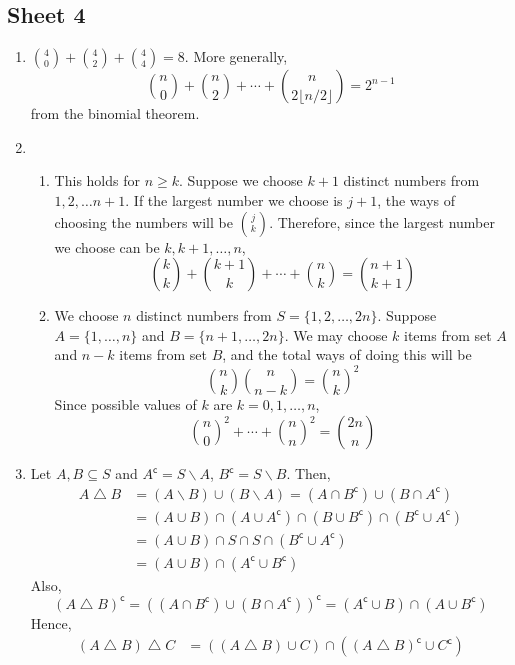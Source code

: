 \documentclass[10pt, a4paper, twoside]{report}
\begin{document}
\subsection{Sheet 4}
\begin{enumerate}[{1.}]
    \item \(\binom 40+\binom 42+\binom 44=8\). More generally, 
    \[\binom n0+\binom n2+\cdots +\binom n{2\lfloor n/2\rfloor}=2^{n-1}\]
    from the binomial theorem.
    \item \begin{enumerate}[{(i)}]
        \item This holds for \(n\geq k\). Suppose we choose \(k+1\) distinct numbers from \({1,2,\ldots n+1}\). If the largest number we choose is \(j+1\), the ways of choosing the numbers will be \(\binom jk\). Therefore, since the largest number we choose can be \(k,k+1,\ldots,n\),
        \[\binom kk+\binom{k+1}k+\cdots+\binom nk=\binom{n+1}{k+1}\]
        \item We choose \(n\) distinct numbers from \(S=\{1,2,\ldots,2n\}\). Suppose \(A=\{1,\ldots,n\}\) and \(B=\{n+1,\ldots,2n\}\). We may choose \(k\) items from set \(A\) and \(n-k\) items from set \(B\), and the total ways of doing this will be 
        \[\binom nk\binom n{n-k}={\binom nk}^2\]
        Since possible values of \(k\) are \(k=0,1,\ldots,n\),
        \[{\binom n0}^2+\cdots+{\binom nn}^2=\binom{2n}n\]
    \end{enumerate}
    \item Let \(A,B\subseteq S\) and \(A^\mathsf{c}=S\backslash A\), \(B^\mathsf{c}=S\backslash B\). Then,
    \begin{align*}
        A\bigtriangleup B&=(A\backslash B)\cup(B\backslash A)=(A\cap B^\mathsf{c})\cup(B\cap A^\mathsf{c}) \\
        &=(A\cup B)\cap (A\cup A^\mathsf{c})\cap (B\cup B^\mathsf{c})\cap (B^\mathsf{c}\cup A^\mathsf{c}) \\
        &=(A\cup B)\cap S\cap S\cap (B^\mathsf{c}\cup A^\mathsf{c}) \\
        &=(A\cup B)\cap(A^\mathsf{c}\cup B^\mathsf{c})
    \end{align*}
    Also,
    \[(A\bigtriangleup B)^\mathsf{c}=\left((A\cap B^\mathsf{c})\cup(B\cap A^\mathsf{c})\right)^\mathsf{c}=(A^\mathsf{c}\cup B)\cap(A\cup B^\mathsf{c})\]
    Hence,
    \begin{align*}
        (A\bigtriangleup B)\bigtriangleup C&=((A\bigtriangleup B)\cup C)\cap ((A\bigtriangleup B)^\mathsf{c}\cup C^\mathsf{c}) \\

\end{align*}
\end{enumerate}
\end{document}
